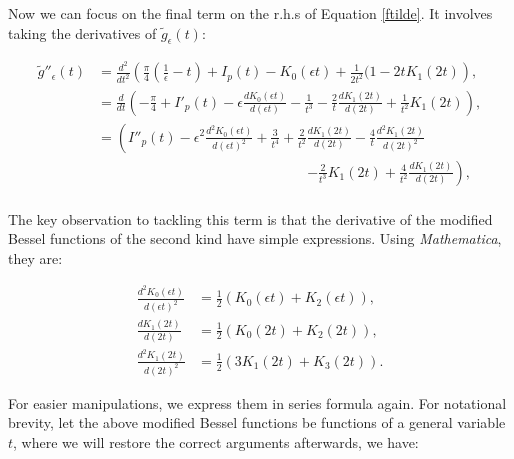 \documentclass{article}
\numberwithin{equation}{section} %
\begin{document}
Now we can focus on the final term on the r.h.s of Equation \ref{ftilde}. It involves taking the derivatives of $\tilde{g}_\epsilon(t)$:

\begin{equation}
\begin{split}
\tilde{g}''_\epsilon(t) &= \frac{d^2}{dt^2}\left( \frac{\pi}{4}\left( \frac{1}{\epsilon} - t \right) + I_p(t) - K_0(\epsilon t) + \frac{1}{2t^2}(1 - 2tK_1(2t) \right),\\
&=\frac{d}{dt}\left(-\frac{\pi}{4} + I'_p(t) - \epsilon\frac{dK_0(\epsilon t)}{d(\epsilon t)} - \frac{1}{t^3} - \frac{2}{t}\frac{dK_1(2t)}{d(2t)} + \frac{1}{t^2}K_1(2t) \right),\\
&=\left(I''_p(t) - \epsilon^2\frac{d^2K_0(\epsilon t)}{d(\epsilon t)^2} + \frac{3}{t^4} + \frac{2}{t^2}\frac{dK_1(2t)}{d(2t)} - \frac{4}{t}\frac{d^2K_1(2t)}{d(2t)^2} \right.\\
& \quad \quad \quad \quad \quad \quad \quad \quad \quad \quad \quad \quad \quad \quad \quad  \left. - \frac{2}{t^3}K_1(2t) + \frac{4}{t^2}\frac{dK_1(2t)}{d(2t)}  \right),\\
\end{split}
\label{lim 3}
\end{equation}

\noindent The key observation to tackling this term is that the derivative of the modified Bessel functions of the second kind have simple expressions. Using \textit{Mathematica}, they are:

\begin{equation}
\begin{split}
\frac{d^2K_0(\epsilon t)}{d(\epsilon t)^2} &= \frac{1}{2}( K_0(\epsilon t) + K_2(\epsilon t)),\\
\frac{dK_1(2t)}{d(2t)} &= \frac{1}{2}(K_0(2t) + K_2(2t)),\\
\frac{d^2K_1(2t)}{d(2t)^2} &= \frac{1}{2}(3K_1(2t) + K_3(2t)). 
\end{split}
\end{equation}

\noindent For easier manipulations, we express them in series formula again. For notational brevity, let the above modified Bessel functions be functions of a general variable $t$, where we will restore the correct arguments afterwards, we have:
\end{document}
